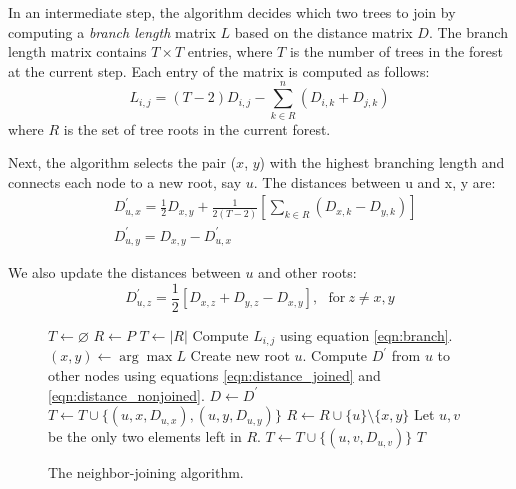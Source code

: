 \documentclass[11pt,letterpaper]{article}
\let\oldReturn\Return
\renewcommand{\Return}{\State\oldReturn}
\theoremstyle{definition}
\begin{document}
In an intermediate step, the algorithm decides which two trees to join by computing a \textit{branch length} matrix $L$ based on the distance matrix $D$. The branch length matrix contains $T \times T$ entries, where $T$ is the number of trees in the forest at the current step. Each entry of the matrix is computed as follows:  
\begin{equation}
  L_{i, j} = (T - 2) D_{i, j} - \sum_{k \in R}^n (D_{i, k} + D_{j, k})
  \label{eqn:branch}
\end{equation} where $R$ is the set of tree roots in the current forest.

Next, the algorithm selects the pair ($x$, $y$) with the highest branching length and connects each node to a new root, say $u$. The distances between u and x, y are:  
\begin{equation}
\begin{split}
  & D_{u, x}^{'} = \frac{1}{2} D_{x, y} + \frac{1}{2(T - 2)} \left[ \sum_{k \in R} (D_{x, k} - D_{y, k}) \right] 
\\  
& D_{u, y}^{'} = D_{x, y} - D_{u, x}^{'}
\end{split}
\label{eqn:distance_joined}
\end{equation}

We also update the distances between $u$ and other roots:
\begin{equation}
  D_{u, z}^{'} = \frac{1}{2} \left[ D_{x, z} + D_{y, z} - D_{x, y} \right], \ \ \ \text{for} \ z \neq x, y
\label{eqn:distance_nonjoined}
\end{equation}

\begin{figure}[t]
  \begin{algorithmic}[1]
      \State $T \leftarrow \varnothing$ 
      \State $R \leftarrow P$
        \State $T \leftarrow |R|$
          \State Compute $L_{i, j}$ using equation \ref{eqn:branch}. 
        \EndFor
        \State $(x, y) \leftarrow \arg \max L$
        \State Create new root $u$.
        \State Compute $D^{'}$ from $u$ to other nodes using equations \ref{eqn:distance_joined} and \ref{eqn:distance_nonjoined}.
        \State $D \leftarrow D^{'}$
        \State $T \leftarrow T \cup \{(u, x, D_{u, x}), (u, y, D_{u, y})\}$
        \State $R \leftarrow R \cup \{u\} \setminus \{x, y\}$
      \EndFor
    \State Let $u, v$ be the only two elements left in $R$.
    \State $T \leftarrow T \cup \{(u, v, D_{u, v})\}$
    \Return $T$
   \EndFunction
  \end{algorithmic}
  \caption{\label{alg:nj}The neighbor-joining algorithm.}
\end{figure}
\end{document}
